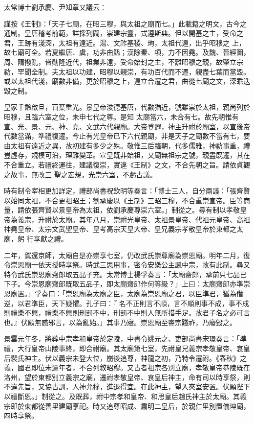 \begin{pinyinscope}
 太常博士劉承慶、尹知章又議云：



 謹按《王制》：「天子七廟，在昭三穆，與太祖之廟而七。」此載籍之明文，古今之通制。皇唐稽考前範，詳採列闢，崇建宗靈，式遵斯典。但以開基之主，受命之君，王跡有淺深，太祖有遠近。湯、文祚基稷、珣，太祖代遠，出乎昭穆之
 上，故七廟可全。若夏繼唐、虞，功非由鯀；漢除秦、項，力不因堯。及魏、晉經圖，周、隋撥亂，皆勛隆近代，祖業非遠，受命始封之主，不離昭穆之親，故肇立宗祊，罕聞全制。夫太祖以功建，昭穆以親崇，有功百代而不遷，親盡七葉而當毀。或以太祖代淺，廟數非備，更於昭穆之上，遠立合遷之君，曲從七廟之文，深乖迭毀之制。



 皇家千齡啟旦，百葉重光。景皇帝浚德基唐，代數猶近，號雖崇於太祖，親尚列於昭穆，且臨六室之位，未申七代之尊。是知
 太廟當六，未合有七。故先朝惟有宣、光、景、元、神、堯、文武六代親廟。大帝登遐，神主升祔於廟室，以宣後帝代數當滿，準禮復遷。今止有光皇帝已下六代親廟，非是天子之廟數不當有七，要由太祖有遠近之異，故初建有多少之殊。敬惟三后臨朝，代多儒雅，神祊事重，禮豈虛存，規模可沿，理難變革。宣皇既非始祖，又廟無祖宗之號，親盡既遷，其在不合重立。若禮終運往，建議復崇，實違《王制》之文，不合先朝之旨。請依貞觀之故事，無改三
 聖之宏規，光崇六室，不虧古議。



 時有制令宰相更加詳定，禮部尚書祝欽明等奏言：「博士三人，自分兩議：「張齊賢以始同太祖，不合更祖昭王；劉承慶以《王制》三昭三穆，不合重崇宣帝。臣等商量，請依張齊賢以景皇帝為太祖，依劉承慶尊崇六室。」制從之。尋有制以孝敬皇帝為義宗，升祔於太廟。其年八月，崇祔光皇帝、太祖景皇帝、代祖元皇帝、高祖神堯皇帝、太宗文武聖皇帝、皇考高宗天皇大帝、皇兄義宗孝敬皇帝於東都之太廟，躬
 行享獻之禮。



 二年，駕還京師，太廟自是亦崇享七室，仍改武氏崇尊廟為崇恩廟。明年二月，復令崇恩廟一依天授時享祭。時武三思用事，密令安樂公主諷中宗，故有此制。尋又特令武氏崇恩廟齋郎取五品子充。太常博士楊孚奏言：「太廟齋郎，承前只七品已下子。今崇恩廟齋郎既取五品子，即太廟齋郎作何等級？」上曰：太廟齋郎亦準崇恩廟置。」孚奏曰：「崇恩廟為太廟之臣，太廟為崇恩廟之君，以臣準君，猶為僭逆，以君準臣，天下疑懼。孔子曰：『
 名不正則言不順，言不順則事不成，事不成則禮樂不興，禮樂不興則刑罰不中，刑罰不中則人無所措手足。故君子名之必可言也。』伏願無惑邪言，以為亂始。」其事乃寢。崇恩廟至睿宗踐祚，乃廢毀之。



 景雲元年冬，將葬中宗孝和皇帝於定陵，中書令姚元之、吏部尚書宋璟奏言：「準禮，大行皇帝山陵事終，即合祔廟。其太廟第七室，先祔皇兄義宗孝敬皇帝、哀皇后裴氏神主。伏以義宗未登大位，崩後追尊，神龍之初，乃特令遷祔。《春秋》之
 義，國君即位未逾年者，不合列敘昭穆。又古者祖宗各別立廟，孝敬皇帝恭陵既在洛州，望於東都別立義宗之廟，遷祔孝敬皇帝、哀皇后神主，命有司以時享祭，則不違先旨，又協古訓，人神允穆，進退得宜。在此神主，望入夾室安置。伏願陛下以禮斷恩。」制從之。及既葬，祔中宗孝和皇帝、和思皇后趙氏神主於太廟。其義宗即於東都從善里建廟享祀。時又追尊昭成、肅明二皇后，於親仁里別置儀坤廟，四時享祭。




\end{pinyinscope}
